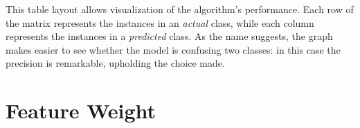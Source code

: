  \noindent This table layout allows visualization of the algorithm's performance. Each row of the matrix represents the instances in an \textit{actual} class, while each column represents the instances in a \textit{predicted} class. As the name suggests, the graph makes easier to see whether the model is confusing two classes: in this case the precision is remarkable, upholding the choice made.


 \section{Feature Weight}
\label{sec:feature-weight}

\textcolor{dimgray}{\lipsum[1-2]}